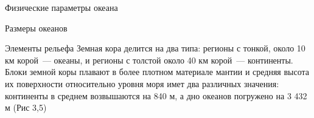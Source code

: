 \begin{chapter}{Физические параметры океана}
\begin{section}{Размеры океанов}
\end{section}

\begin{section}{Элементы рельефа}
Земная кора делится на два типа: регионы с тонкой, около 10 км
корой~--- океаны, и регионы с толстой около 40 км корой~--- 
континенты. Блоки земной коры плавают в более плотном материале мантии
и средняя высота их поверхности относительно уровня моря имет два
различных значения: континенты в среднем возвышаются на 840 м, а дно
океанов погружено на 3 432 м (Рис 3,5)
%



\end{section}
\end{chapter}
